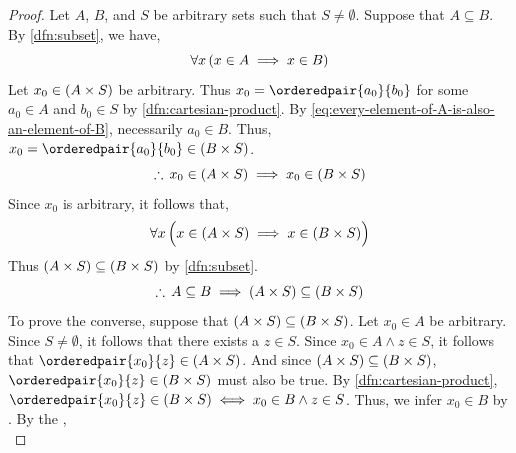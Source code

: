 \begin{proof}
    Let \( A \), \( B \), and \( S \) be arbitrary sets such that \( S \neq \emptyset \). Suppose that \( A \subseteq B \). By \cref{dfn:subset},
    we have,
    \begin{equation}
        \label{eq:every-element-of-A-is-also-an-element-of-B}
        \forall x \, \mleft( x \in A \implies x \in B \mright)
    \end{equation}
    Let \( x_{0} \in \mleft( A \times S \mright) \) be arbitrary.
    Thus \( x_{0} = \orderedpair{a_{0}}{b_{0}} \)
    for some \( a_{0} \in A \) and \( b_{0} \in S \) by \cref{dfn:cartesian-product}.
    By \eqref{eq:every-element-of-A-is-also-an-element-of-B}, necessarily \( a_{0} \in B \).
    Thus, \( x_{0} = \orderedpair{a_{0}}{b_{0}} \in \mleft( B \times S \mright) \).
    \begin{equation*}
        \therefore \, x_{0} \in \mleft( A \times S \mright) \implies x_{0} \in \mleft( B \times S \mright)
    \end{equation*}
    Since \( x_{0} \) is arbitrary, it follows that,
    \begin{equation*}
        \forall x \, \Big( x \in \mleft( A \times S \mright) \implies x \in \mleft( B \times S \mright) \Big)
    \end{equation*}
    Thus \( \mleft( A \times S \mright) \subseteq \mleft( B \times S \mright) \) by \cref{dfn:subset}.
    \begin{equation}
        \label{eq:A-subset-B-implies-A-times-S-subset-B-times-S}
        \therefore \,
        A \subseteq B \implies \mleft( A \times S \mright) \subseteq \mleft( B \times S \mright)
    \end{equation}
    To prove the converse, suppose that \( \mleft( A \times S \mright) \subseteq \mleft( B \times S \mright) \).
    Let \( x_{0} \in A \) be arbitrary. Since \( S \neq \emptyset \), it follows that there exists a \( z \in S \).
    Since \( x_{0} \in A \land z \in S \), it follows that \( \orderedpair{x_{0}}{z} \in \mleft( A \times S \mright) \).
    And since \( \mleft( A \times S \mright) \subseteq \mleft( B \times S \mright) \),
    \( \orderedpair{x_{0}}{z} \in \mleft( B \times S \mright) \) must also be true. By \cref{dfn:cartesian-product},
    \( \orderedpair{x_{0}}{z} \in \mleft( B \times S \mright) \iff x_{0} \in B \land z \in S \).
    Thus, we infer \( x_{0} \in B \) by . By the ,
    \begin{equation*}

\end{equation*}
\end{proof}
